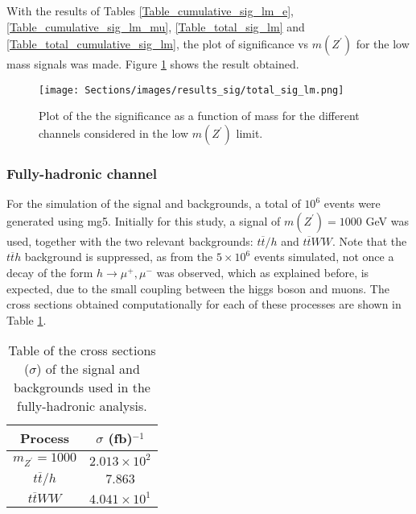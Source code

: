 With the results of Tables \ref{Table_cumulative_sig_lm_e}, \ref{Table_cumulative_sig_lm_mu}, \ref{Table_total_sig_lm} and \ref{Table_total_cumulative_sig_lm}, the plot of significance vs $m(Z^{\prime})$ for the low mass signals was made. Figure \ref{result_sig_lm} shows the result obtained.

\begin{figure}[ht!]
    \centering
    \texttt{[image: Sections/images/results\_sig/total\_sig\_lm.png]}
    \caption{Plot of the the significance as a function of mass for the different channels considered in the low $m(Z^{\prime})$ limit.}
    \label{result_sig_lm}
\end{figure}

\subsubsection{Fully-hadronic channel} \label{ssec:fully-hadronic channel}

For the simulation of the signal and backgrounds, a total of $10^6$ events were generated using mg5. Initially for this study, a signal of $m(Z^{\prime}) = 1000$ GeV was used, together with the two relevant backgrounds: $t\overline t/h$ and $t\overline tWW$. Note that the $t\overline th$ background is suppressed, as from the $5\times10^6$ events simulated, not once a decay of the form $h\rightarrow\mu^+,\mu^-$ was observed, which as explained before, is expected, due to the small coupling between the higgs boson and muons. The cross sections obtained computationally for each of these processes are shown in Table \ref{crosssectionshadronic}.

\begin{table}[ht!]
\centering
\caption{Table of the cross sections ($\sigma$) of the signal and backgrounds used in the fully-hadronic analysis.}
\label{crosssectionshadronic}
\begin{tabular}{cc}
\hline
\hline
Process & $\sigma$ (fb)$^{-1}$ \\
\hline
$m_{Z^{\prime}} = 1000$ & $2.013\times10^2$ \\
$t\overline t/h$ & $7.863$ \\
$t\overline tWW$ & $4.041\times10^1$ \\
\hline
\hline
\end{tabular}
\end{table}

